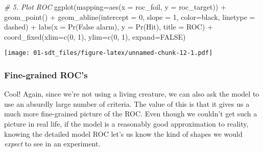 \documentclass[
]{book}
\newenvironment{Shaded}{\begin{snugshade}}{\end{snugshade}}
\newcommand{\AttributeTok}[1]{\textcolor[rgb]{0.77,0.63,0.00}{#1}}
\newcommand{\CommentTok}[1]{\textcolor[rgb]{0.56,0.35,0.01}{\textit{#1}}}
\newcommand{\ConstantTok}[1]{\textcolor[rgb]{0.00,0.00,0.00}{#1}}
\newcommand{\DecValTok}[1]{\textcolor[rgb]{0.00,0.00,0.81}{#1}}
\newcommand{\FunctionTok}[1]{\textcolor[rgb]{0.00,0.00,0.00}{#1}}
\newcommand{\NormalTok}[1]{#1}
\newcommand{\SpecialCharTok}[1]{\textcolor[rgb]{0.00,0.00,0.00}{#1}}
\newcommand{\StringTok}[1]{\textcolor[rgb]{0.31,0.60,0.02}{#1}}
\begin{document}
\begin{Shaded}
\begin{Highlighting}[]
\CommentTok{\# 5. Plot ROC}
\FunctionTok{ggplot}\NormalTok{(}\AttributeTok{mapping=}\FunctionTok{aes}\NormalTok{(}\AttributeTok{x =}\NormalTok{ roc\_foil, }\AttributeTok{y =}\NormalTok{ roc\_target)) }\SpecialCharTok{+}
    \FunctionTok{geom\_point}\NormalTok{() }\SpecialCharTok{+}
    \FunctionTok{geom\_abline}\NormalTok{(}\AttributeTok{intercept =} \DecValTok{0}\NormalTok{, }\AttributeTok{slope =} \DecValTok{1}\NormalTok{, }\AttributeTok{color=}\StringTok{\textquotesingle{}black\textquotesingle{}}\NormalTok{, }\AttributeTok{linetype =} \StringTok{\textquotesingle{}dashed\textquotesingle{}}\NormalTok{) }\SpecialCharTok{+}
    \FunctionTok{labs}\NormalTok{(}\AttributeTok{x =} \StringTok{\textquotesingle{}Pr(False alarm)\textquotesingle{}}\NormalTok{, }\AttributeTok{y =} \StringTok{\textquotesingle{}Pr(Hit)\textquotesingle{}}\NormalTok{, }\AttributeTok{title =} \StringTok{\textquotesingle{}ROC\textquotesingle{}}\NormalTok{) }\SpecialCharTok{+}
    \FunctionTok{coord\_fixed}\NormalTok{(}\AttributeTok{xlim=}\FunctionTok{c}\NormalTok{(}\DecValTok{0}\NormalTok{, }\DecValTok{1}\NormalTok{), }\AttributeTok{ylim=}\FunctionTok{c}\NormalTok{(}\DecValTok{0}\NormalTok{, }\DecValTok{1}\NormalTok{), }\AttributeTok{expand=}\ConstantTok{FALSE}\NormalTok{)}
\end{Highlighting}
\end{Shaded}

\texttt{[image: 01-sdt\_files/figure-latex/unnamed-chunk-12-1.pdf]}

\hypertarget{fine-grained-rocs}{%
\subsubsection{Fine-grained ROC's}\label{fine-grained-rocs}}

Cool! Again, since we're not using a living creature, we can also ask the model to use an absurdly large number of criteria. The value of this is that it gives us a much more fine-grained picture of the ROC. Even though we couldn't get such a picture in real life, if the model is a reasonably good approximation to reality, knowing the detailed model ROC let's us know the kind of shapes we would \emph{expect} to see in an experiment.
\end{document}
